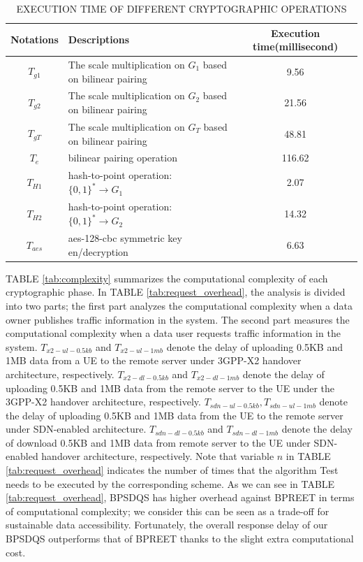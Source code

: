 \documentclass[journal]{IEEEtran}
\begin{document}
\begin{table}[t!]
\centering 
\caption{EXECUTION TIME OF DIFFERENT CRYPTOGRAPHIC OPERATIONS \cite{BPREET}}
\begin{tabular}{|c|p{25em}|c|}
\hline
    Notations & Descriptions & Execution time(millisecond) \\
\hline
    $T_{g1}$ & The scale multiplication on $G_1$ based on bilinear pairing & 9.56 \\
\hline
    $T_{g2}$ & The scale multiplication on $G_2$ based on bilinear pairing & 21.56 \\
\hline
    $T_{gT}$ & The scale multiplication on $G_T$ based on bilinear pairing & 48.81 \\
\hline
    $T_e$ & bilinear pairing operation & 116.62 \\
\hline
    $T_{H1}$ & hash-to-point operation: $\{0,1\}^* \to G_1$ & 2.07 \\
\hline
    $T_{H2}$ & hash-to-point operation: $\{0,1\}^* \to G_2$ & 14.32 \\
\hline
    $T_{aes}$ & aes-128-cbc symmetric key en/decryption & 6.63 \\
\hline
\end{tabular}
\label{tab:execution_time}
\end{table}
  
    TABLE \ref{tab:complexity} summarizes the computational complexity of each cryptographic phase. In TABLE \ref{tab:request_overhead}, the analysis is divided into two parts; the first part analyzes the computational complexity when a data owner publishes traffic information in the system. The second part measures the computational complexity when a data user requests traffic information in the system. $T_{x2-ul-0.5kb}$ and $T_{x2-ul-1mb}$ denote the delay of uploading 0.5KB and 1MB data from a UE to the remote server under 3GPP-X2 handover architecture, respectively. $T_{x2-dl-0.5kb}$ and $T_{x2-dl-1mb}$ denote the delay of uploading 0.5KB and 1MB data from the remote server to the UE under the 3GPP-X2 handover architecture, respectively. $T_{sdn-ul-0.5kb}, T_{sdn-ul-1mb}$ denote the delay of uploading 0.5KB and 1MB data from the UE to the remote server under SDN-enabled architecture. $T_{sdn-dl-0.5kb}$ and $T_{sdn-dl-1mb}$ denote the delay of download 0.5KB and 1MB data from remote server to the UE under SDN-enabled handover architecture, respectively. Note that variable $n$ in TABLE \ref{tab:request_overhead} indicates the number of times that the algorithm Test needs to be executed by the corresponding scheme. As we can see in TABLE \ref{tab:request_overhead}, BPSDQS has higher overhead against BPREET in terms of computational complexity; we consider this can be seen as a trade-off for sustainable data accessibility. Fortunately, the overall response delay of our BPSDQS outperforms that of BPREET thanks to the slight extra computational cost.
\end{document}

